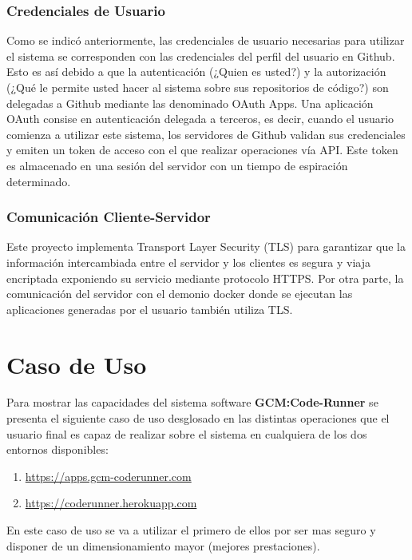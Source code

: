 \documentclass[a4paper,11pt]{book}
\begin{document}
\subsubsection{Credenciales de Usuario}

Como se indicó anteriormente, las credenciales de usuario necesarias para utilizar el sistema se corresponden con las credenciales del perfil del usuario en Github. Esto es así debido a que la autenticación (¿Quien es usted?) y la autorización (¿Qué le permite usted hacer al sistema sobre sus repositorios de código?) son delegadas a Github mediante las denominado OAuth Apps. Una aplicación OAuth consise en autenticación delegada a terceros, es decir, cuando el usuario comienza a utilizar este sistema, los servidores de Github validan sus credenciales y emiten un token de acceso con el que realizar operaciones vía API. Este token es almacenado en una sesión del servidor con un tiempo de espiración determinado. 

\subsubsection{Comunicación Cliente-Servidor}

Este proyecto implementa Transport Layer Security (TLS) para garantizar que la información intercambiada entre el servidor y los clientes es segura y viaja encriptada exponiendo su servicio mediante protocolo HTTPS. Por otra parte, la comunicación del servidor con el demonio docker donde se ejecutan las aplicaciones generadas por el usuario también utiliza TLS.

\section{Caso de Uso}

Para mostrar las capacidades del sistema software \textbf{GCM:Code-Runner} se presenta el siguiente caso de uso desglosado en las distintas operaciones que el usuario final es capaz de realizar sobre el sistema en cualquiera de los dos entornos disponibles:

\begin{enumerate}
\item \url{https://apps.gcm-coderunner.com}
\item \url{https://coderunner.herokuapp.com}
\end{enumerate}

En este caso de uso se va a utilizar el primero de ellos por ser mas seguro y disponer de un dimensionamiento mayor (mejores prestaciones).
\end{document}
